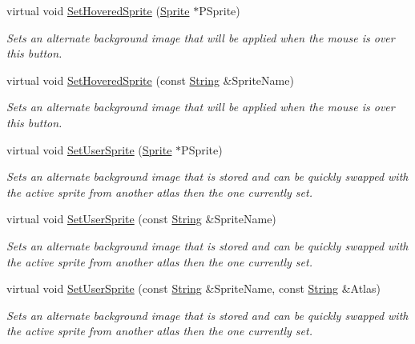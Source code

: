 \begin{DoxyCompactItemize}
virtual void \hyperlink{classMezzanine_1_1UI_1_1Button_a93f0554750c433dc9c14f0611fc00a10}{SetHoveredSprite} (\hyperlink{structMezzanine_1_1UI_1_1Sprite}{Sprite} $\ast$PSprite)
\begin{DoxyCompactList}\small\item\em Sets an alternate background image that will be applied when the mouse is over this button. \item\end{DoxyCompactList}\item 
virtual void \hyperlink{classMezzanine_1_1UI_1_1Button_a6fa21a055fb5d806248240bbae5f5ad6}{SetHoveredSprite} (const \hyperlink{namespaceMezzanine_acf9fcc130e6ebf08e3d8491aebcf1c86}{String} \&SpriteName)
\begin{DoxyCompactList}\small\item\em Sets an alternate background image that will be applied when the mouse is over this button. \item\end{DoxyCompactList}\item 
virtual void \hyperlink{classMezzanine_1_1UI_1_1Button_a94b9ce563b2aacbd71e559c660026cc8}{SetUserSprite} (\hyperlink{structMezzanine_1_1UI_1_1Sprite}{Sprite} $\ast$PSprite)
\begin{DoxyCompactList}\small\item\em Sets an alternate background image that is stored and can be quickly swapped with the active sprite from another atlas then the one currently set. \item\end{DoxyCompactList}\item 
virtual void \hyperlink{classMezzanine_1_1UI_1_1Button_aecb07e754310f1c53af92b323c385e92}{SetUserSprite} (const \hyperlink{namespaceMezzanine_acf9fcc130e6ebf08e3d8491aebcf1c86}{String} \&SpriteName)
\begin{DoxyCompactList}\small\item\em Sets an alternate background image that is stored and can be quickly swapped with the active sprite from another atlas then the one currently set. \item\end{DoxyCompactList}\item 
virtual void \hyperlink{classMezzanine_1_1UI_1_1Button_a7ea91306176ad94d136ca8de7321a5ae}{SetUserSprite} (const \hyperlink{namespaceMezzanine_acf9fcc130e6ebf08e3d8491aebcf1c86}{String} \&SpriteName, const \hyperlink{namespaceMezzanine_acf9fcc130e6ebf08e3d8491aebcf1c86}{String} \&Atlas)
\begin{DoxyCompactList}\small\item\em Sets an alternate background image that is stored and can be quickly swapped with the active sprite from another atlas then the one currently set. \item\end{DoxyCompactList}\item 

\end{DoxyCompactItemize}
